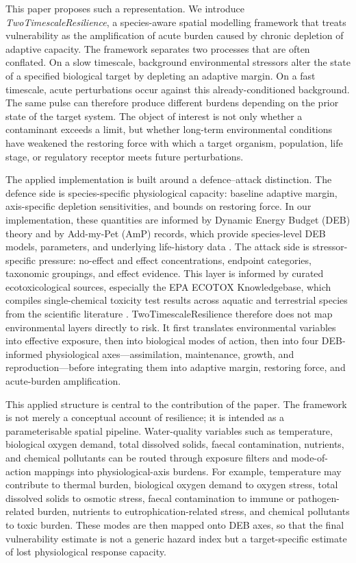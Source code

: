 	This paper proposes such a representation. We introduce \emph{TwoTimescaleResilience}, a species-aware spatial modelling framework that treats vulnerability as the amplification of acute burden caused by chronic depletion of adaptive capacity. The framework separates two processes that are often conflated. On a slow timescale, background environmental stressors alter the state of a specified biological target by depleting an adaptive margin. On a fast timescale, acute perturbations occur against this already-conditioned background. The same pulse can therefore produce different burdens depending on the prior state of the target system. The object of interest is not only whether a contaminant exceeds a limit, but whether long-term environmental conditions have weakened the restoring force with which a target organism, population, life stage, or regulatory receptor meets future perturbations.
	
	The applied implementation is built around a defence--attack distinction. The defence side is species-specific physiological capacity: baseline adaptive margin, axis-specific depletion sensitivities, and bounds on restoring force. In our implementation, these quantities are informed by Dynamic Energy Budget (DEB) theory and by Add-my-Pet (AmP) records, which provide species-level DEB models, parameters, and underlying life-history data \citep{kooijman2010deb,marques2018amp}. The attack side is stressor-specific pressure: no-effect and effect concentrations, endpoint categories, taxonomic groupings, and effect evidence. This layer is informed by curated ecotoxicological sources, especially the EPA ECOTOX Knowledgebase, which compiles single-chemical toxicity test results across aquatic and terrestrial species from the scientific literature \citep{olker2022ecotox,epa2026ecotox}. TwoTimescaleResilience therefore does not map environmental layers directly to risk. It first translates environmental variables into effective exposure, then into biological modes of action, then into four DEB-informed physiological axes---assimilation, maintenance, growth, and reproduction---before integrating them into adaptive margin, restoring force, and acute-burden amplification.
	
	This applied structure is central to the contribution of the paper. The framework is not merely a conceptual account of resilience; it is intended as a parameterisable spatial pipeline. Water-quality variables such as temperature, biological oxygen demand, total dissolved solids, faecal contamination, nutrients, and chemical pollutants can be routed through exposure filters and mode-of-action mappings into physiological-axis burdens. For example, temperature may contribute to thermal burden, biological oxygen demand to oxygen stress, total dissolved solids to osmotic stress, faecal contamination to immune or pathogen-related burden, nutrients to eutrophication-related stress, and chemical pollutants to toxic burden. These modes are then mapped onto DEB axes, so that the final vulnerability estimate is not a generic hazard index but a target-specific estimate of lost physiological response capacity.
	
